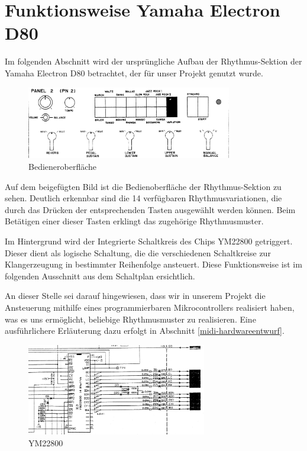 \section{Funktionsweise Yamaha Electron D80}
\label{sec:d80}

Im folgenden Abschnitt wird der ursprüngliche Aufbau der Rhythmus-Sektion der Yamaha Electron D80 betrachtet, der für unser Projekt genutzt wurde.

\begin{figure}[H]
    \centering
    \includegraphics[width=0.8\textwidth]{Images/Rhythmus.png}
    \caption[Bedieneroberfläche]{Bedieneroberfläche \cite{ServiceManual}}
    \label{fig:Bediener Oberfläche}
\end{figure}

Auf dem beigefügten Bild ist die Bedienoberfläche der Rhythmus-Sektion zu sehen. Deutlich erkennbar sind die 14 verfügbaren Rhythmusvariationen, die durch das Drücken der entsprechenden Tasten ausgewählt werden können. Beim Betätigen einer dieser Tasten erklingt das zugehörige Rhythmusmuster.

Im Hintergrund wird der Integrierte Schaltkreis des Chips YM22800 getriggert. Dieser dient als logische Schaltung, die die verschiedenen Schaltkreise zur Klangerzeugung in bestimmter Reihenfolge ansteuert. Diese Funktionsweise ist im folgenden Ausschnitt aus dem Schaltplan ersichtlich.

An dieser Stelle sei darauf hingewiesen, dass wir in unserem Projekt die Ansteuerung mithilfe eines programmierbaren Mikrocontrollers realisiert haben, was es uns ermöglicht, beliebige Rhythmusmuster zu realisieren. Eine ausführlichere Erläuterung dazu erfolgt in Abschnitt \ref{midi-hardwareentwurf}.


\begin{figure}[H]
    \centering
    \includegraphics[width=0.7\textwidth]{Images/YM22800.png}
    \caption[YM22800]{YM22800 \cite{ServiceManual}}
    
    \label{fig:YM22800}
\end{figure}

